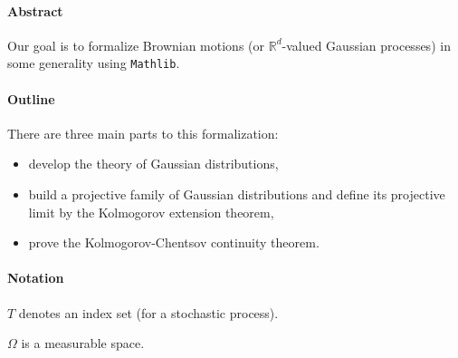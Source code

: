 %

\paragraph{Abstract}

Our goal is to formalize Brownian motions (or $\mathbb R^d$-valued Gaussian processes) in some generality using \texttt{Mathlib}.

\paragraph{Outline}

There are three main parts to this formalization:
\begin{itemize}
  \item develop the theory of Gaussian distributions,
  \item build a projective family of Gaussian distributions and define its projective limit by the Kolmogorov extension theorem,
  \item prove the Kolmogorov-Chentsov continuity theorem.
\end{itemize}

\paragraph{Notation}

$T$ denotes an index set (for a stochastic process).

$\Omega$ is a measurable space.







